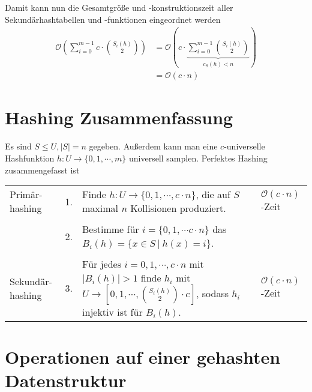 \documentclass{scrartcl}%
\begin{document}
    Damit kann nun die Gesamtgröße und -konstruktionszeit aller Sekundärhashtabellen und \mbox{-funktionen} eingeordnet werden
    \begin{equation*}
        \begin{align*}
            \mathcal{O}\left( \sum_{i=0}^{m-1} c \cdot \binom{S_i(h)}{2} \right) &= \mathcal{O}\left(c \cdot \underbrace{\sum_{i=0}^{m-1} \binom{S_i(h)}{2}}_{c_S(h) < n} \right) \\\nonumber
            & = \mathcal{O}(c \cdot n)
        \end{align*}
    \end{equation*}

    \newpage
    \section*{Hashing Zusammenfassung}
    Es sind $S \leq U, |S| =n$ gegeben.
    Außerdem kann man eine $c$-universelle Hashfunktion $h: U \rightarrow \{ 0,1, \cdots, m \}$ universell samplen.
    Perfektes Hashing zusammengefasst ist

    \begin{table}[H]
        \centering
        \begin{tabular}{L{2cm}lL{8cm}R{2cm}}
            \\ [-2.5ex]
            Primär-hashing & 1. & Finde $h:U \rightarrow \{ 0,1, \cdots, c \cdot n \}$, die auf $S$ maximal $n$ Kollisionen produziert. & $\mathcal{O}(c \cdot n)$-Zeit \\
            \\ [0ex]
            & 2.& Bestimme für $i= \{ 0, 1, \cdots c \cdot n \}$ das $B_i(h) = \{ x \in S\ |\ h(x)=i \}$. & \\
            \\[0ex]
            Sekundär-hashing & 3.& Für jedes $i=0, 1, \cdots, c \cdot n$ mit $|B_i(h)| > 1$ finde $h_i$ mit
            $U \rightarrow \left[ 0,1, \cdots, \binom{S_i(h)}{2} \cdot c \right]$, sodass $h_i$ injektiv ist für $B_i(h)$.& $\mathcal{O}(c \cdot n)$-Zeit\\
        \end{tabular}
    \end{table}

    \section*{Operationen auf einer gehashten Datenstruktur}
\end{document}
